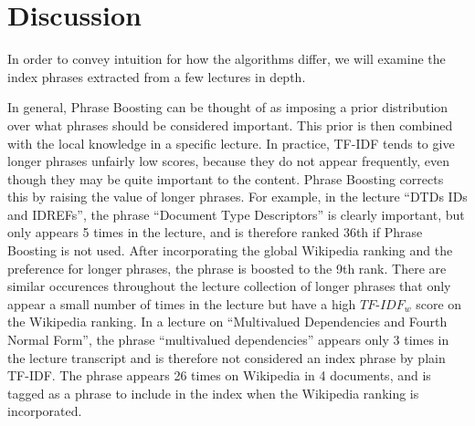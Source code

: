 \section{Discussion}
\label{sec:discussion}

In order to convey intuition for how the algorithms differ, we will
examine the index phrases extracted from a few lectures in depth.

In general, Phrase Boosting can be thought of as imposing a prior
distribution over what phrases should be considered important. This
prior is then combined with the local knowledge in a specific
lecture. In practice, TF-IDF tends to give longer phrases unfairly low
scores, because they do not appear frequently, even though they may be
quite important to the content. Phrase Boosting corrects this by
raising the value of longer phrases. For example, in the lecture
``DTDs IDs and IDREFs'', the phrase ``Document Type Descriptors'' is
clearly important, but only appears 5 times in the lecture, and is
therefore ranked 36th if Phrase Boosting is not used. After
incorporating the global Wikipedia ranking and the preference for
longer phrases, the phrase is boosted to the 9th rank. There are
similar occurences throughout the lecture collection of longer phrases
that only appear a small number of times in the lecture but have a
high $TF\text{-}IDF_w$ score on the Wikipedia ranking. In a lecture on
``Multivalued Dependencies and Fourth Normal Form'', the phrase
``multivalued dependencies'' appears only 3 times in the lecture
transcript and is therefore not considered an index phrase by plain
TF-IDF. The phrase appears 26 times on Wikipedia in 4 documents, and
is tagged as a phrase to include in the index when the Wikipedia
ranking is incorporated.


